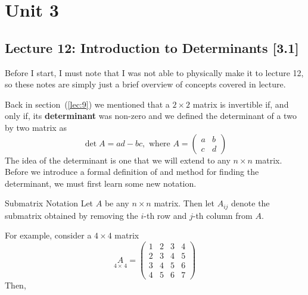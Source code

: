 \section{Unit 3}
\subsection{Lecture 12: Introduction to Determinants [3.1]}

\begin{impbox}{}{}
    Before I start, I must note that I was not able to physically make it to lecture 12, so these notes are simply just a brief overview of concepts covered in lecture.
\end{impbox}

Back in section~(\ref{lec:9}) we mentioned that a $2 \times 2$ matrix is invertible if, and only if, its \textbf{determinant} was non-zero and we defined the determinant of a two by two matrix as 
\[
    \det{A} = ad - bc, \text{ where } A = \begin{pmatrix}
        a & b \\ c & d
    \end{pmatrix}
\]
The idea of the determinant is one that we will extend to any $n \times n$ matrix. Before we introduce a formal definition of and method for finding the determinant, we must first learn some new notation. 

\begin{defbox}{Submatrix Notation}{}
    Let $A$ be any $n \times n$ matrix. Then let $A_{ij}$ denote the submatrix obtained by removing the $i$-th row and $j$-th column from $A$. 
\end{defbox}

For example, consider a $4 \times 4$ matrix 
\[
    \underset{4\times\,4}{A} = \begin{pmatrix}
        1 & 2 & 3 & 4 \\
        2 & 3 & 4 & 5 \\
        3 & 4 & 5 & 6 \\
        4 & 5 & 6 & 7
    \end{pmatrix}
\]
Then, 

